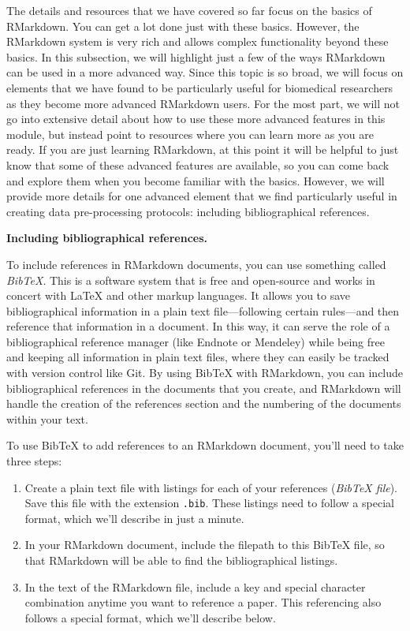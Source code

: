 \documentclass[]{tufte-book}
\providecommand{\tightlist}{%
  \setlength{\itemsep}{0pt}\setlength{\parskip}{0pt}}
\begin{document}
The details and resources that we have covered so far focus on the basics of
RMarkdown. You can get a lot done just with these basics. However, the RMarkdown
system is very rich and allows complex functionality beyond these basics. In
this subsection, we will highlight just a few of the ways RMarkdown can be used
in a more advanced way. Since this topic is so broad, we will focus on elements
that we have found to be particularly useful for biomedical researchers as they
become more advanced RMarkdown users. For the most part, we will not go into
extensive detail about how to use these more advanced features in this module,
but instead point to resources where you can learn more as you are ready. If you
are just learning RMarkdown, at this point it will be helpful to just know that
some of these advanced features are available, so you can come back and explore
them when you become familiar with the basics. However, we will provide more
details for one advanced element that we find particularly useful in creating data
pre-processing protocols: including bibliographical references.

\textbf{Including bibliographical references.}

To include references in RMarkdown documents, you can use something called
\emph{BibTeX}. This is a software system that is free and open-source and works in
concert with LaTeX and other markup languages. It allows you to save bibliographical information in a plain
text file---following certain rules---and then reference that information in a
document. In this way, it can serve the role of a bibliographical reference
manager (like Endnote or Mendeley) while being free and keeping all information
in plain text files, where they can easily be tracked with version control like
Git. By using BibTeX with RMarkdown, you can include bibliographical references
in the documents that you create, and RMarkdown will handle the creation of the
references section and the numbering of the documents within your text.

To use BibTeX to add references to an RMarkdown document, you'll need to take
three steps:

\begin{enumerate}
\def\labelenumi{\arabic{enumi}.}
\tightlist
\item
  Create a plain text file with listings for each of
  your references (\emph{BibTeX file}). Save this file with the
  extension \texttt{.bib}. These listings need to follow a special format, which
  we'll describe in just a minute.
\item
  In your RMarkdown document, include the filepath
  to this BibTeX file, so that RMarkdown will be able to find the bibliographical
  listings.
\item
  In the text of the RMarkdown file, include a key and special character
  combination anytime you want to reference a paper. This referencing also
  follows a special format, which we'll describe below.
\end{enumerate}
\end{document}
